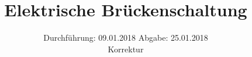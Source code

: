 

\subject{V302}
\title{Elektrische Brückenschaltung}
\date{%
  Durchführung: 09.01.2018
  \hspace{3em}
  Abgabe: 25.01.2018 \\
  Korrektur
}



\maketitle
\thispagestyle{empty}
\tableofcontents
\newpage






\printbibliography{}


